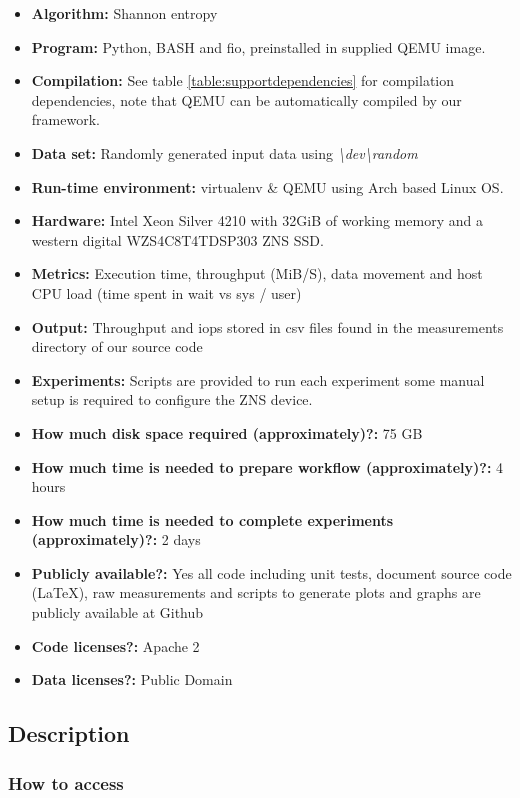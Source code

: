 {\small
\begin{itemize}
  \item {\textbf{Algorithm:} Shannon entropy}
  \item {\textbf{Program:} Python, BASH and fio, preinstalled in supplied
  QEMU image.}
  \item {\textbf{Compilation:} See table \ref{table:supportdependencies} for
  compilation dependencies, note that QEMU can be automatically compiled by our
  framework.}
  \item {\textbf{Data set:} Randomly generated input data using \textit{\textbackslash dev\textbackslash random}}
  \item {\textbf{Run-time environment:} virtualenv \& QEMU using Arch based Linux OS.}
  \item {\textbf{Hardware:} Intel Xeon Silver 4210 with 32GiB of working memory and
  a western digital WZS4C8T4TDSP303 ZNS SSD.}
  \item {\textbf{Metrics:} Execution time, throughput (MiB/S), data movement and
  host CPU load (time spent in wait vs sys / user)}
  \item {\textbf{Output:} Throughput and iops stored in csv files found in the
  measurements directory of our source code \cite{qemu-csd}}
  \item {\textbf{Experiments:} Scripts are provided to run each experiment some
  manual setup is required to configure the ZNS device.}
  \item {\textbf{How much disk space required (approximately)?:} 75 GB}
  \item {\textbf{How much time is needed to prepare workflow (approximately)?:} 4 hours}
  \item {\textbf{How much time is needed to complete experiments (approximately)?:} 2 days}
  \item {\textbf{Publicly available?:} Yes all code including unit tests, document
  source code (LaTeX), raw measurements and scripts to generate plots and graphs
  are publicly available at Github \cite{qemu-csd}}
  \item {\textbf{Code licenses?:} Apache 2}
  \item {\textbf{Data licenses?:} Public Domain}
\end{itemize}
}

\subsection{Description}

\subsubsection*{How to access}


